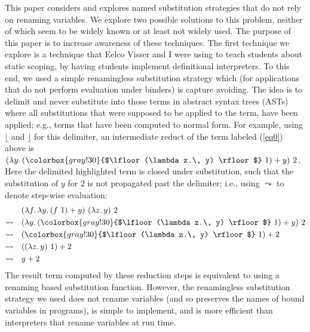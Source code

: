 This paper considers and explores named substitution strategies that do not rely on renaming variables.
We explore two possible solutions to this problem, neither of which seem to be widely known or at least not widely used.
The purpose of this paper is to increase awareness of these techniques.
The first technique we explore is a technique that Eelco Visser and I were using to teach students about static scoping, by having students implement definitional interpreters.
To this end, we used a simple renamingless substitution strategy which (for applications that do not perform evaluation under binders) is capture avoiding.
The idea is to delimit and never substitute into those terms in abstract syntax trees (ASTs) where all substitutions that were supposed to be applied to the term, have been applied; e.g., terms that have been computed to normal form.
For example, using $\lfloor$ and $\rfloor$ for this delimiter, an intermediate reduct of the term labeled (\ref{eq0}) above is $(\lambda y.\, (\colorbox{gray!30}{$\lfloor (\lambda z.\, y) \rfloor$}\ 1) + y)\ 2$.
Here the delimited \colorbox{gray!30}{highlighted} term is closed under substitution, such that the substitution of $y$ for $2$ is not propagated past the delimiter; i.e., using $\leadsto$ to denote step-wise evaluation:
\begin{align*}
  & (\lambda f .\, \lambda y .\, (f\ 1) + y)\ (\lambda z .\, y)\ 2
  \\
  \leadsto\quad & (\lambda y.\, (\colorbox{gray!30}{$\lfloor (\lambda z.\, y) \rfloor$}\ 1) + y)\ 2
  \\
  \leadsto\quad & (\colorbox{gray!30}{$\lfloor (\lambda z.\, y) \rfloor$}\ 1) + 2
  \\
  \leadsto\quad & ((\lambda z.\, y)\ 1) + 2
  \\
  \leadsto\quad & y + 2
\end{align*}
%
The result term computed by these reduction steps is equivalent to using a renaming based substitution function.
However, the renamingless substitution strategy we used does not rename variables (and so preserves the names of bound variables in programs), is simple to implement, and is more efficient than interpreters that rename variables at run time.

